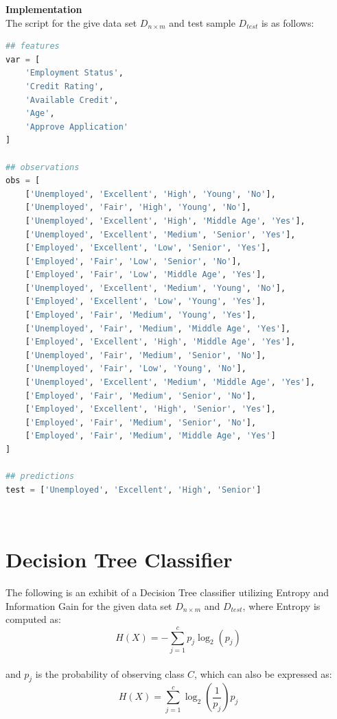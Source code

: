 \documentclass{article}
\begin{document}
\break
\item \textbf{Implementation}\\
The script for the give data set $D_{n \times m}$ and test sample $D_{test}$ is as follows:

\begin{lstlisting}[language=Python, title=Python 3: Data Set \& Test Sample]
## features
var = [
    'Employment Status',
    'Credit Rating',
    'Available Credit',
    'Age',
    'Approve Application'
]

## observations
obs = [
    ['Unemployed', 'Excellent', 'High', 'Young', 'No'],
    ['Unemployed', 'Fair', 'High', 'Young', 'No'],
    ['Unemployed', 'Excellent', 'High', 'Middle Age', 'Yes'],
    ['Unemployed', 'Excellent', 'Medium', 'Senior', 'Yes'],
    ['Employed', 'Excellent', 'Low', 'Senior', 'Yes'],
    ['Employed', 'Fair', 'Low', 'Senior', 'No'],
    ['Employed', 'Fair', 'Low', 'Middle Age', 'Yes'],
    ['Unemployed', 'Excellent', 'Medium', 'Young', 'No'],
    ['Employed', 'Excellent', 'Low', 'Young', 'Yes'],
    ['Employed', 'Fair', 'Medium', 'Young', 'Yes'],
    ['Unemployed', 'Fair', 'Medium', 'Middle Age', 'Yes'],
    ['Employed', 'Excellent', 'High', 'Middle Age', 'Yes'],
    ['Unemployed', 'Fair', 'Medium', 'Senior', 'No'],
    ['Unemployed', 'Fair', 'Low', 'Young', 'No'],
    ['Unemployed', 'Excellent', 'Medium', 'Middle Age', 'Yes'],
    ['Employed', 'Fair', 'Medium', 'Senior', 'No'],
    ['Employed', 'Excellent', 'High', 'Senior', 'Yes'],
    ['Employed', 'Fair', 'Medium', 'Senior', 'No'],
    ['Employed', 'Fair', 'Medium', 'Middle Age', 'Yes']
]

## predictions
test = ['Unemployed', 'Excellent', 'High', 'Senior']\end{lstlisting}\\

\section*{Decision Tree Classifier}
The following is an exhibit of a Decision Tree classifier utilizing Entropy and Information Gain for the given data set $D_{n \times m}$ and $D_{test}$, where Entropy is computed as:
\begin{equation}
    H(X) = - \sum_{j=1}^{c}p_j \log_2 (p_j)
\end{equation}\\
and $p_j$ is the probability of observing class $C$, which can also be expressed as:
\begin{equation}
    H(X) = \sum_{j=1}^{c} \log_2 \left( \frac{1}{p_j} \right) p_j
\end{equation}
\end{document}
